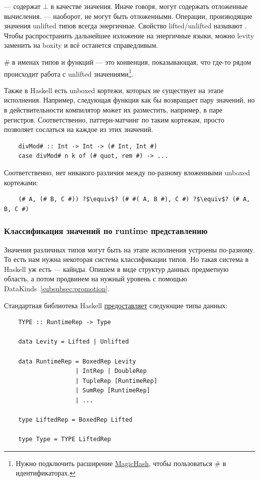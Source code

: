  --- содержат $\bot$ в качестве значения.
Иначе говоря, могут содержать отложенные вычисления. %
 --- наоборот, не могут быть отложенными.
Операции, производящие значения unlifted типов всегда энергичные.
Свойство lifted/unlifted называют .
Чтобы распространить дальнейшее изложение на энергичные языки, можно levity заменить на boxity и всё останется справедливым.

\# в именах типов и функций --- это конвенция, показывающая, что где-то рядом происходит работа с unlifted значениями\footnote{Нужно подключить расширение \href{https://ghc.gitlab.haskell.org/ghc/doc/users_guide/exts/magic_hash.html}{MagicHash}, чтобы пользоваться \# в идентификаторах.}.

Также в Haskell есть unboxed кортежи, которых не существует на этапе исполнения.
Например, следующая функция как бы возвращает пару значений, но в действительности компилятор может их разместить, например, в паре регистров.
Соответственно, паттерн-матчинг по таким кортежам, просто позволяет сослаться на каждое из этих значений.
\begin{verbatim}
    divMod# :: Int -> Int -> (# Int, Int #)
    case divMod# n k of (# quot, rem #) -> ...
\end{verbatim}
Соответственно, нет никакого различия между по-разному вложенными unboxed кортежами:
\begin{verbatim}
    (# A, (# B, C #)) ?$\equiv$? (# #( A, B #), C #) ?$\equiv$? (# A, B, C #)
\end{verbatim}

\subsubsection{Классификация значений по runtime представлению}

Значения различных типов могут быть на этапе исполнения устроены по-разному.
То есть нам нужна некоторая система классификации типов.
Но такая система в Haskell уж есть --- кайнды.
Опишем в виде структур данных предметную область, а потом продвинем на нужный уровень с помощью DataKinds~\ref{subsubsec:promotion}.

Стандартная библиотека Haskell \href{https://downloads.haskell.org/ghc/latest/docs/users_guide/exts/representation_polymorphism.html}{предоставляет} следующие типы данных:
\begin{verbatim}
    TYPE :: RuntimeRep -> Type

    data Levity = Lifted | Unlifted

    data RuntimeRep = BoxedRep Levity
                    | IntRep | DoubleRep
                    | TupleRep [RuntimeRep]
                    | SumRep [RuntimeRep]
                    | ...

    type LiftedRep = BoxedRep Lifted

    type Type = TYPE LiftedRep
\end{verbatim}

